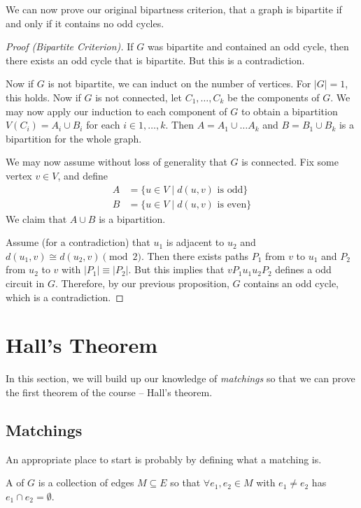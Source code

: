 \documentclass[a4paper]{scrartcl}
\begin{document}
We can now prove our original bipartness criterion, that a graph is bipartite if and only if it contains no odd cycles.

\begin{proof}[Proof (Bipartite Criterion)]
	If $G$ was bipartite and contained an odd cycle, then there exists an odd cycle that is bipartite. But this is a contradiction.

	Now if $G$ is not bipartite, we can induct on the number of vertices. For $|G| = 1$, this holds. Now if $G$ is not connected, let $C_1, \dots, C_k$ be the components of $G$. We may now apply our induction to each component of $G$ to obtain a bipartition $V(C_i) = A_i \cup B_i$ for each $i \in 1, \dots, k$. Then $A = A_1 \cup \dots A_k$ and $B = B_1 \cup B_k$ is a bipartition for the whole graph. 
	
	We may now assume without loss of generality that $G$ is connected. Fix some vertex $v \in V$, and define 
	\begin{align*}
		A &= \{u \in V \mid d(u, v) \text{ is odd} \} \\
		B &=  \{u \in V \mid d(u, v) \text{ is even} \}
	\end{align*}
	We claim that $A \cup B$ is a bipartition.

	Assume (for a contradiction) that $u_1$ is adjacent to $u_2$ and $d(u_1, v) \cong d(u_2, v) \pmod{2}$. Then there exists paths $P_1$ from $v$ to $u_1$ and $P_2$ from $u_2$ to $v$ with $|P_1| \equiv |P_2|$. But this implies that $vP_1u_1 u_2 P_2$ defines a odd circuit in $G$. Therefore, by our previous proposition, $G$ contains an odd cycle, which is a contradiction. 
\end{proof}

\section{Hall's Theorem}

In this section, we will build up our knowledge of \emph{matchings} so that we can prove the first theorem of the course -- Hall's theorem.

\subsection{Matchings}

An appropriate place to start is probably by defining what a matching is.

\begin{definition}[Matching]
	A  of $G$ is a collection of edges $M \subseteq E$ so that $\forall e_1, e_2 \in M$ with $e_1 \neq e_2$ has $e_1 \cap e_2 = \emptyset$.
\end{definition}
\end{document}
